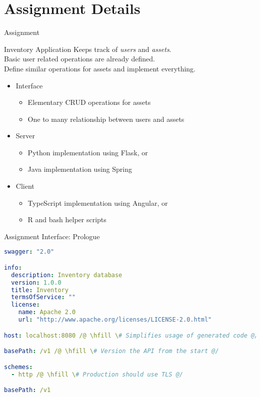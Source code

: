 \section{Assignment Details}


\begin{frame}{Assignment}
    \begin{block}{Inventory Application}
        Keeps track of \emph{users} and \emph{assets}. \\
        Basic user related operations are already defined. \\
        Define similar operations for assets and implement everything.
    \end{block}

    \begin{itemize}
        \item Interface
        \begin{itemize}
            \item Elementary CRUD operations for assets
            \item One to many relationship between users and assets
        \end{itemize}
        \item Server
        \begin{itemize}
            \item Python implementation using Flask, or
            \item Java implementation using Spring
        \end{itemize}
        \item Client
        \begin{itemize}
            \item TypeScript implementation using Angular, or
            \item R and bash helper scripts
        \end{itemize}
    \end{itemize}
\end{frame}


\begin{frame}[fragile]{Assignment Interface: Prologue}
\begin{lstlisting}[language=yaml,style=mini]
swagger: "2.0"

info:
  description: Inventory database
  version: 1.0.0
  title: Inventory
  termsOfService: ""
  license:
    name: Apache 2.0
    url: "http://www.apache.org/licenses/LICENSE-2.0.html"

host: localhost:8080 /@ \hfill \# Simplifies usage of generated code @/

basePath: /v1 /@ \hfill \# Version the API from the start @/

schemes:
  - http /@ \hfill \# Production should use TLS @/

basePath: /v1
\end{lstlisting}
\end{frame}


